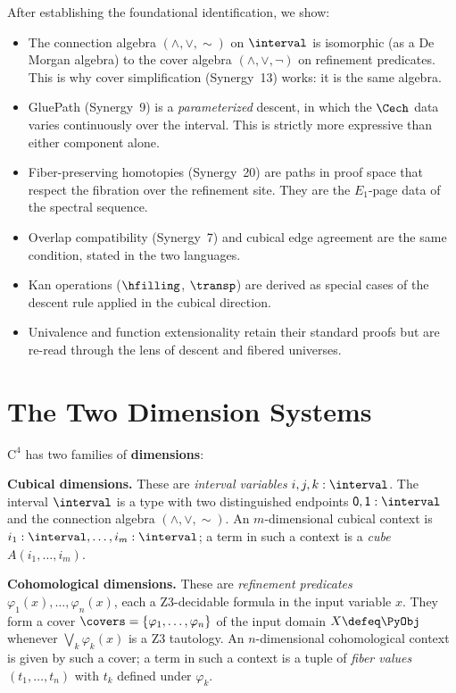 After establishing the foundational identification, we show:
\begin{itemize}
\item The connection algebra $(\wedge, \vee, \sim)$ on $\interval$ is
  isomorphic (as a De Morgan algebra) to the cover algebra
  $(\wedge, \vee, \neg)$ on refinement predicates.  This is why cover
  simplification (Synergy~13) works: it is the same algebra.

\item \textsf{GluePath} (Synergy~9) is a \emph{parameterized} descent,
  in which the $\Cech$ data varies continuously over the interval.  This is
  strictly more expressive than either component alone.

\item Fiber-preserving homotopies (Synergy~20) are paths in proof space that
  respect the fibration over the refinement site.  They are the
  $E_1$-page data of the spectral sequence.

\item Overlap compatibility (Synergy~7) and cubical edge agreement are the
  same condition, stated in the two languages.

\item Kan operations ($\hfilling$, $\transp$) are derived as special cases of
  the descent rule applied in the cubical direction.

\item Univalence and function extensionality retain their standard proofs but
  are re-read through the lens of descent and fibered universes.
\end{itemize}


\section{The Two Dimension Systems}
\label{sec:two-dimensions}

\begin{definition}
\label{def:two-dims}
$\mathrm{C}^4$ has two families of \textbf{dimensions}:

\medskip
\noindent\textbf{Cubical dimensions.}  These are \emph{interval variables}
$i, j, k : \interval$.  The interval $\interval$ is a type with two
distinguished endpoints $\mathsf{0}, \mathsf{1} : \interval$ and the
connection algebra $(\wedge, \vee, \sim)$.  An $m$-dimensional cubical
context is $i_1 : \interval, \ldots, i_m : \interval$; a term in such a
context is a \emph{cube} $A(i_1, \ldots, i_m)$.

\medskip
\noindent\textbf{Cohomological dimensions.}  These are \emph{refinement
predicates} $\varphi_1(x), \ldots, \varphi_n(x)$, each a Z3-decidable
formula in the input variable $x$.  They form a cover
$\covers = \{\varphi_1, \ldots, \varphi_n\}$ of the input domain
$X \defeq \PyObj$ whenever $\bigvee_k \varphi_k(x)$ is a Z3 tautology.
An $n$-dimensional cohomological context is given by such a cover;
a term in such a context is a tuple of \emph{fiber values}
$(t_1, \ldots, t_n)$ with $t_k$ defined under $\varphi_k$.
\end{definition}

